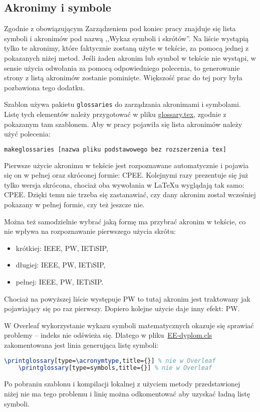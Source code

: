 \subsection{Akronimy i symbole}
Zgodnie z obowiązującym Zarządzeniem pod koniec pracy znajduje się lista symboli i akronimów pod nazwą ,,Wykaz symboli i skrótów''. Na liście wystąpią tylko te akronimy, które faktycznie zostaną użyte w tekście, za pomocą jednej z pokazanych niżej metod. Jeśli żaden akronim lub symbol w tekście nie wystąpi, w sensie użycia odwołania za pomocą odpowiedniego polecenia, to generowanie strony z listą akronimów zostanie pominięte. Większość prac do tej pory była pozbawiona tego dodatku.

Szablon używa pakietu \texttt{glossaries} do zarządzania akronimami i symbolami. Listę tych elementów należy przygotować w pliku \href{./glossary.tex}{glossary.tex}, zgodnie z pokazanym tam szablonem. Aby w pracy pojawiła się lista akronimów należy użyć polecenia:

\begin{lstlisting}[language=bash,
    numbers=none,
    caption=Wygenerowanie listy skrótów i symboli,
    label={lst:gloss}]
makeglossaries [nazwa pliku podstawowego bez rozszerzenia tex]
\end{lstlisting}

Pierwsze użycie akronimu w tekście jest rozpoznawane automatycznie i pojawia się on w pełnej oraz skróconej formie: \gls{CPEE}. Kolejnymi razy prezentuje się już tylko wersja skrócona, chociaż oba wywołania w \LaTeX{u} wyglądają tak samo: \gls{CPEE}. Dzięki temu nie trzeba się zastanawiać, czy dany akronim został wcześniej pokazany w pełnej formie, czy też jeszcze nie.

Można też samodzielnie wybrać jaką formę ma przybrać akronim w tekście, co nie wpływa na rozpoznawanie pierwszego użycia skrótu:
\begin{itemize}
    \item krótkiej: \acrshort{IEEE}, \acrshort{PW}, \acrshort{IETiSIP},
    \item długiej: \acrlong{IEEE}, \acrlong{PW}, \acrlong{IETiSIP},
    \item pełnej: \acrfull{IEEE}, \acrfull{PW}, \acrfull{IETiSIP}.
\end{itemize}

Chociaż na powyższej liście występuje \gls{PW} to tutaj akronim jest traktowany jak pojawiający się po raz pierwszy. Dopiero kolejne użycie daje inny efekt: \gls{PW}.

W Overleaf wykorzystanie wykazu symboli matematycznych okazuje się sprawiać problemy -- indeks nie odświeża się. Dlatego w pliku~\href{./EE-dyplom.cls}{EE-dyplom.cls} zakomentowana jest linia generująca listę symboli:
\begin{lstlisting}[language=TeX,
    numbers=none,
    caption=EE-dyplom.cls,
    label={lst:EE-dyplom}]
    \printglossary[type=\acronymtype,title={}] % nie w Overleaf
    \printglossary[type=symbols,title={}] % nie w Overleaf
\end{lstlisting}
Po pobraniu szablonu i kompilacji lokalnej z użyciem metody przedstawionej niżej nie ma tego problemu i linię można odkomentować aby uzyskać ładną listę symboli.

